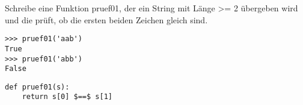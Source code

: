 \question[2] Schreibe eine Funktion pruef01, der ein String mit Länge >= 2
übergeben wird und die prüft, ob die ersten beiden Zeichen gleich sind.
\begin{lstlisting}
>>> pruef01('aab')
True
>>> pruef01('abb')
False
\end{lstlisting}
\begin{solutionbox}{4cm}
\begin{lstlisting}
def pruef01(s):
    return s[0] $==$ s[1]
\end{lstlisting}
\end{solutionbox}
